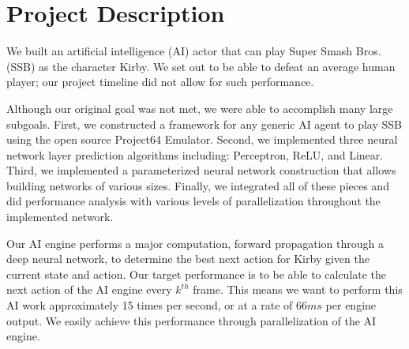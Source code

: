\chapter*{Project Description}

We built an artificial intelligence (AI) actor that can play Super Smash Bros. (SSB) as the character Kirby.
We set out to be able to defeat an average human player; our project timeline did not allow for such performance.

Although our original goal was not met, we were able to accomplish many large subgoals. 
First, we constructed a framework for any generic AI agent to play SSB using the open source Project64 Emulator.
Second, we implemented three neural network layer prediction algorithms including: Perceptron, ReLU, and Linear. 
Third, we implemented a parameterized neural network construction that allows building networks of various sizes.
Finally, we integrated all of these pieces and did performance analysis with various levels of parallelization throughout the implemented network.

Our AI engine performs a major computation, forward propagation through a deep neural network, to determine the best next action for Kirby given the current state and action. 
Our target performance is to be able to calculate the next action of the AI engine every $k^{th}$ frame. 
This means we want to perform this AI work approximately 15 times per second, or at a rate of $66ms$ per engine output.
We easily achieve this performance through parallelization of the AI engine.
